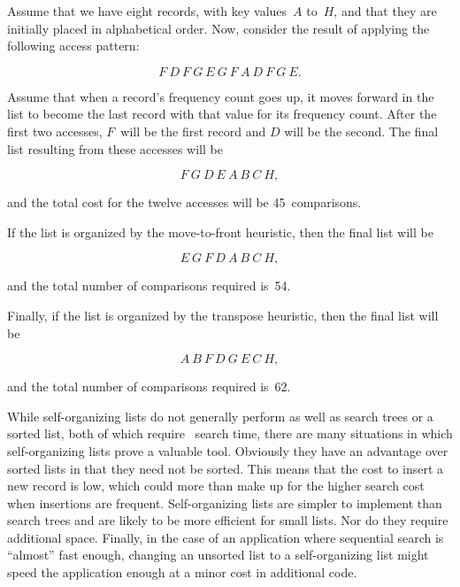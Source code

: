 \begin{example}
Assume that we have eight records, with key values~\(A\) to~\(H\),
and that they are initially placed in alphabetical order.
Now, consider the result of applying the following access pattern:

\vspace{-\medskipamount}
\[ F~D~F~G~E~G~F~A~D~F~G~E.\]

\vspace{-\medskipamount}
\noindent 
Assume that when a record's frequency count goes up, it moves
forward in the list to become the last record with that value for its
frequency count.
After the first two accesses, \(F\)~will be the first record and \(D\)
will be the second.
The final list resulting from these accesses will be

\vspace{-\medskipamount}
\[ F~G~D~E~A~B~C~H,\]

\vspace{-\medskipamount}
\noindent and the total cost for the twelve accesses will be
45~comparisons.

If the list is organized by the move-to-front heuristic, then the
final list will be

\vspace{-\medskipamount}
\[ E~G~F~D~A~B~C~H,\]

\vspace{-\medskipamount}
\noindent and the total number of comparisons required is~54.

Finally, if the list is organized by the transpose heuristic, then the
final list will be

\vspace{-\medskipamount}
\[ A~B~F~D~G~E~C~H,\]

\vspace{-\medskipamount}
\noindent and the total number of comparisons required is~62.
\end{example}

While self-organizing lists do not generally perform as well
as search trees or a sorted list, both of which require \Ologn\ search
time, there are many situations in which self-organizing lists prove a
valuable tool.
Obviously they have an advantage over sorted lists in that they need
not be sorted.
This means that the cost to insert a new record is low, which could
more than make up for the higher search cost when insertions are
frequent.
Self-organizing lists are simpler to implement than search trees and
are likely to be more efficient for small lists.
Nor do they require additional space.
Finally, in the case of an application where sequential
search is ``almost'' fast enough, changing an
unsorted list to a self-organizing list might speed the
application enough at a minor cost in additional code.

